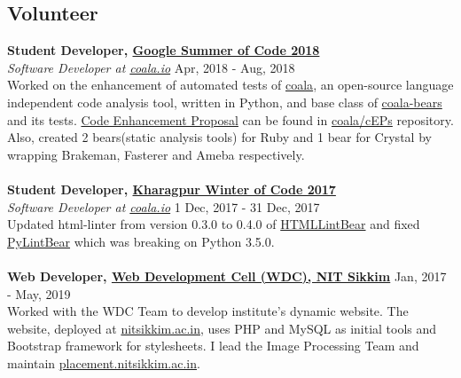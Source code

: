 \documentclass[margin, centered]{res}
\begin{document}
\begin{resume}
    \section{Volunteer}
    \textbf{Student Developer, \href{https://summerofcode.withgoogle.com/}{Google Summer of Code 2018}} \\
    \emph{Software Developer at \href{https://coala.io/}{coala.io}} \hfill Apr, 2018 - Aug, 2018 \\
    Worked on the enhancement of automated tests of \href{https://github.com/coala/coala}{coala},
    an open-source language independent code analysis tool, written in Python, and base
    class of \href{https://github.com/coala/coala-bears}{coala-bears} and its tests.
    \href{https://github.com/coala/cEPs/blob/master/cEP-0027.md}{Code Enhancement Proposal} can be found
    in \href{https://github.com/coala/cEPs}{coala/cEPs} repository. Also, created 2 bears(static analysis tools)
    for Ruby and 1 bear for Crystal by wrapping Brakeman, Fasterer and Ameba respectively. \\
    \\
    \textbf{Student Developer, \href{https://kwoc.kossiitkgp.in}{Kharagpur Winter of Code 2017}} \\
    \emph{Software Developer at \href{https://coala.io/}{coala.io}} \hfill 1 Dec, 2017 - 31 Dec, 2017 \\
    Updated html-linter from version 0.3.0 to 0.4.0 of
    \href{https://github.com/coala/coala-bears/pull/2148/commits/631ed37f7322fae7b9d7e16616f8c4009b9adb7e}{HTMLLintBear}
    and fixed \href{https://github.com/coala/coala-bears/blob/master/bears/python/PyLintBear.py}{PyLintBear} which was
    breaking on Python 3.5.0. \\
    \\
    \textbf{Web Developer, \href{https://nitsikkim.ac.in/webdevelopmentcell}{Web Development Cell (WDC), NIT Sikkim}} \hfill Jan, 2017 - May, 2019 \\
    Worked with the WDC Team to develop institute's dynamic website. The website, deployed at
    \href{https://www.nitsikkim.ac.in}{nitsikkim.ac.in}, uses PHP and MySQL as initial tools
    and Bootstrap framework for stylesheets. I lead the Image Processing Team and maintain
    \href{https://placement.nitsikkim.ac.in}{placement.nitsikkim.ac.in}.


\end{resume}
\end{document}
